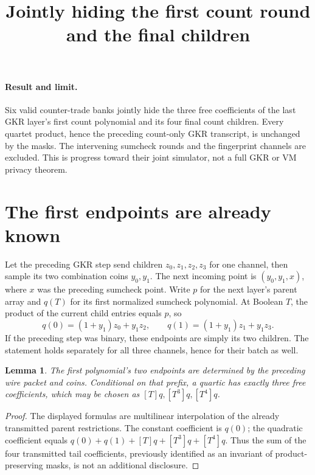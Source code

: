 \documentclass[11pt]{article}
\title{Jointly hiding the first count round and the final children}
\author{}
\date{}
\newtheorem{lemma}{Lemma}
\begin{document}
\maketitle
\vspace{-2em}

\paragraph{Result and limit.} Six valid counter-trade banks jointly hide the three free coefficients of the last GKR layer's first count polynomial and its four final count children. Every quartet product, hence the preceding count-only GKR transcript, is unchanged by the masks. The intervening sumcheck rounds and the fingerprint channels are excluded. This is progress toward their joint simulator, not a full GKR or VM privacy theorem.

\section{The first endpoints are already known}

Let the preceding GKR step send children $z_0,z_1,z_2,z_3$ for one channel, then sample its two combination coins $y_0,y_1$. The next incoming point is $(y_0,y_1,x)$, where $x$ was the preceding sumcheck point. Write $p$ for the next layer's parent array and $q(T)$ for its first normalized sumcheck polynomial. At Boolean $T$, the product of the current child entries equals $p$, so
\[
 q(0)=(1+y_1)z_0+y_1z_2,
 \qquad q(1)=(1+y_1)z_1+y_1z_3.
\]
If the preceding step was binary, these endpoints are simply its two children. The statement holds separately for all three channels, hence for their batch as well.

\begin{lemma}
The first polynomial's two endpoints are determined by the preceding wire packet and coins. Conditional on that prefix, a quartic has exactly three free coefficients, which may be chosen as $[T]q,[T^3]q,[T^4]q$.
\end{lemma}
\begin{proof}
The displayed formulas are multilinear interpolation of the already transmitted parent restrictions. The constant coefficient is $q(0)$; the quadratic coefficient equals $q(0)+q(1)+[T]q+[T^3]q+[T^4]q$. Thus the sum of the four transmitted tail coefficients, previously identified as an invariant of product-preserving masks, is not an additional disclosure.
\end{proof}
\end{document}

